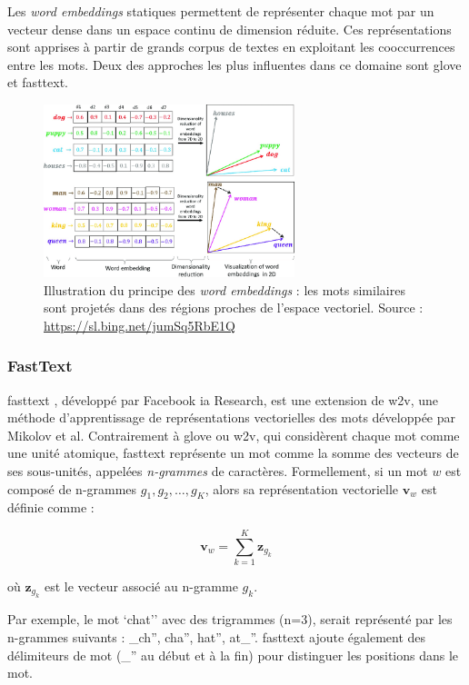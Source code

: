 \documentclass[12pt]{report}
\begin{document}
Les \textit{word embeddings} statiques permettent de représenter chaque mot par un vecteur dense dans un espace continu de dimension réduite. Ces représentations sont apprises à partir de grands corpus de textes en exploitant les cooccurrences entre les mots. Deux des approches les plus influentes dans ce domaine sont \gls{glove} et \gls{fasttext}.

\begin{figure}[H]
    \centering
    \includegraphics[width=0.65\textwidth]{we.png}
    \caption{Illustration du principe des \textit{word embeddings} : les mots similaires sont projetés dans des régions proches de l’espace vectoriel. Source : \url{https://sl.bing.net/jumSq5RbE1Q}}
    \label{fig:word_embeddings}
\end{figure}

\subsubsection{FastText}

\gls{fasttext} \cite{bojanowski2017enriching}, développé par Facebook \gls{ia} Research, est une extension de \gls{w2v}, une méthode d’apprentissage de représentations vectorielles des mots développée par Mikolov et al. Contrairement à \gls{glove} ou \gls{w2v}, qui considèrent chaque mot comme une unité atomique, \gls{fasttext}  représente un mot comme la somme des vecteurs de ses sous-unités, appelées \textit{n-grammes} de caractères. Formellement, si un mot \( w \) est composé de n-grammes \( g_1, g_2, \dots, g_K \), alors sa représentation vectorielle \( \mathbf{v}_w \) est définie comme :

\[
\mathbf{v}_w = \sum_{k=1}^{K} \mathbf{z}_{g_k}
\]

où \( \mathbf{z}_{g_k} \) est le vecteur associé au n-gramme \( g_k \).

Par exemple, le mot `chat'' avec des trigrammes (n=3), serait représenté par les n-grammes suivants : \_ch'', cha'', hat'', at\_''. \gls{fasttext} ajoute également des délimiteurs de mot (\_'' au début et à la fin) pour distinguer les positions dans le mot.
\end{document}
